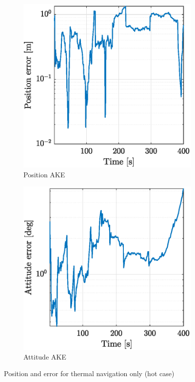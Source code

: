 \begin{figure}[!h]
    \begin{subfigure}{0.48\linewidth}
    \centering
    \includegraphics[width = 1\linewidth]{Images/TIRerrorspos.eps}
    \caption{Position AKE}
    \label{fig:TIRerrorspos}
    \end{subfigure}\hfill
    \begin{subfigure}{0.48\linewidth}
    \centering
    \includegraphics[width = 1\linewidth]{Images/TIRerrorsatt.eps}
    \caption{Attitude AKE}
    \label{fig:TIRerrorsatt}
    \end{subfigure}
    \caption{Position and error for thermal navigation only (hot case)}
    \label{fig:TIRerr_posatt}
\end{figure}

